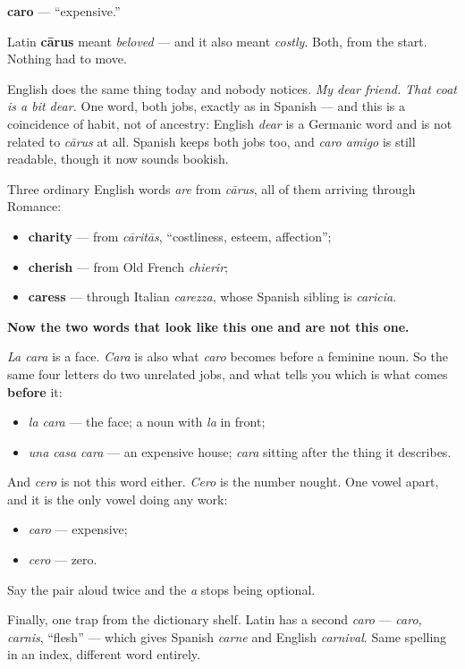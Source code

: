 \begin{cousinweb}
\textbf{caro} — \textquotedblleft{}expensive.\textquotedblright{}

Latin \textbf{cārus} meant \emph{beloved} — and it also meant \emph{costly}. Both, from the start. Nothing had to move.

English does the same thing today and nobody notices. \emph{My dear friend.} \emph{That coat is a bit dear.} One word, both jobs, exactly as in Spanish — and this is a coincidence of habit, not of ancestry: English \emph{dear} is a Germanic word and is not related to \emph{cārus} at all. Spanish keeps both jobs too, and \emph{caro amigo} is still readable, though it now sounds bookish.

Three ordinary English words \emph{are} from \emph{cārus}, all of them arriving through Romance:

\begin{itemize}
\raggedright
  \item \textbf{charity} — from \emph{cāritās}, \textquotedblleft{}costliness, esteem, affection\textquotedblright{};
  \item \textbf{cherish} — from Old French \emph{chierir};
  \item \textbf{caress} — through Italian \emph{carezza}, whose Spanish sibling is \emph{caricia}.
\end{itemize}

\textbf{Now the two words that look like this one and are not this one.}

\emph{La cara} is a face. \emph{Cara} is also what \emph{caro} becomes before a feminine noun. So the same four letters do two unrelated jobs, and what tells you which is what comes \textbf{before} it:

\begin{itemize}
\raggedright
  \item \emph{la cara} — the face; a noun with \emph{la} in front;
  \item \emph{una casa cara} — an expensive house; \emph{cara} sitting after the thing it describes.
\end{itemize}

And \emph{cero} is not this word either. \emph{Cero} is the number nought. One vowel apart, and it is the only vowel doing any work:

\begin{itemize}
\raggedright
  \item \emph{caro} — expensive;
  \item \emph{cero} — zero.
\end{itemize}

Say the pair aloud twice and the \emph{a} stops being optional.

Finally, one trap from the dictionary shelf. Latin has a second \emph{caro} — \emph{caro, carnis}, \textquotedblleft{}flesh\textquotedblright{} — which gives Spanish \emph{carne} and English \emph{carnival}. Same spelling in an index, different word entirely.
\end{cousinweb}

